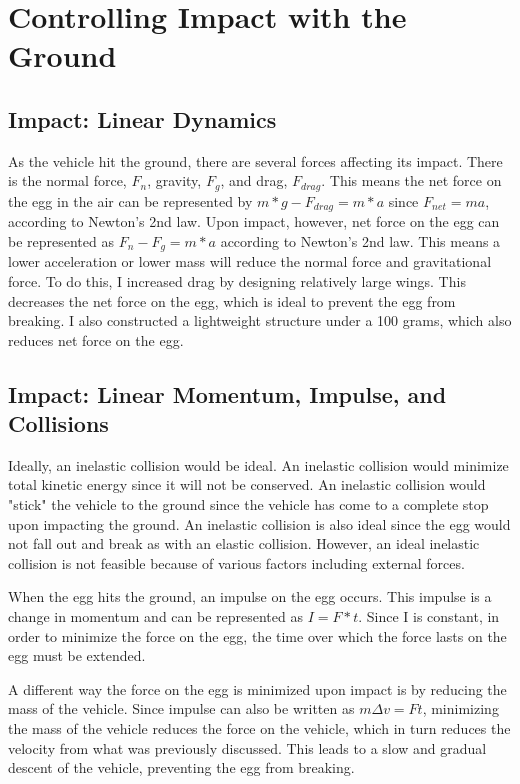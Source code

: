 \documentclass[12pt]{report}
\begin{document}
\chapter{Controlling Impact with the Ground}

\section{Impact: Linear Dynamics}
As the vehicle hit the ground, there are several forces affecting its impact. There is the normal force, $F_n$, gravity, $F_g$, and drag, $F_{drag}$. This means the net force on the egg in the air can be represented by $m*g-F_{drag} = m*a$ since $F_{net} = ma$, according to Newton's 2nd law. Upon impact, however, net force on the egg can be represented as $F_n - F_g = m*a$ according to Newton's 2nd law. This means a lower acceleration or lower mass will reduce the normal force and gravitational force. To do this, I increased drag by designing relatively large wings. This decreases the net force on the egg, which is ideal to prevent the egg from breaking. I also constructed a lightweight structure under a 100 grams, which also reduces net force on the egg.

\section{Impact: Linear Momentum, Impulse, and Collisions}
Ideally, an inelastic collision would be ideal. An inelastic collision would minimize total kinetic energy since it will not be conserved. An inelastic collision would "stick" the vehicle to the ground since the vehicle has come to a complete stop upon impacting the ground. An inelastic collision is also ideal since the egg would not fall out and break as with an elastic collision. However, an ideal inelastic collision is not feasible because of various factors including external forces.

When the egg hits the ground, an impulse on the egg occurs. This impulse is a change in momentum and can be represented as $I = F*t$. Since I is constant, in order to minimize the force on the egg, the time over which the force lasts on the egg must be extended. 

A different way the force on the egg is minimized upon impact is by reducing the mass of the vehicle. Since impulse can also be written as $m\Delta v = Ft$, minimizing the mass of the vehicle reduces the force on the vehicle, which in turn reduces the velocity from what was previously discussed. This leads to a slow and gradual descent of the vehicle, preventing the egg from breaking.
\end{document}
